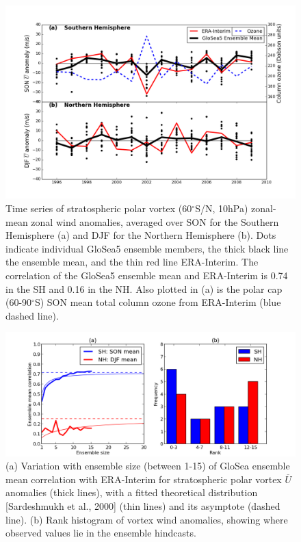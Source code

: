 \begin{figure}[htbp]
\centering
\includegraphics{./figures/seas_winds.png}
\caption{Time series of stratospheric polar vortex (60$^{\circ}$S/N,
10hPa) zonal-mean zonal wind anomalies, averaged over SON for the
Southern Hemisphere (a) and DJF for the Northern Hemisphere (b). Dots
indicate individual GloSea5 ensemble members, the thick black line the
ensemble mean, and the thin red line ERA-Interim. The correlation of the
GloSea5 ensemble mean and ERA-Interim is 0.74 in the SH and 0.16 in the
NH. Also plotted in (a) is the polar cap (60-90$^{\circ}$S) SON mean
total column ozone from ERA-Interim (blue dashed line).}
\end{figure}

\begin{figure}[htbp]
\centering
\includegraphics{./figures/ens_hist.png}
\caption{(a) Variation with ensemble size (between 1-15) of GloSea
ensemble mean correlation with ERA-Interim for stratospheric polar
vortex $\overline{U}$ anomalies (thick lines), with a fitted theoretical
distribution {[}Sardeshmukh et al., 2000{]} (thin lines) and its
asymptote (dashed line). (b) Rank histogram of vortex wind anomalies,
showing where observed values lie in the ensemble hindcasts.}
\end{figure}

